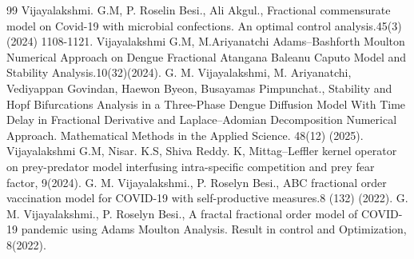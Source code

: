 \documentclass[10pt]{article}
\begin{document}
\begin{thebibliography}{99}
		 Vijayalakshmi. G.M, P. Roselin Besi., Ali Akgul., Fractional commensurate model on Covid-19 with microbial confections. An optimal control analysis.45(3) (2024) 1108-1121.
		 Vijayalakshmi G.M, M.Ariyanatchi Adams–Bashforth Moulton Numerical Approach on Dengue Fractional Atangana Baleanu Caputo Model and Stability Analysis.10(32)(2024).
		 G. M. Vijayalakshmi, M. Ariyanatchi, Vediyappan Govindan, Haewon Byeon, Busayamas Pimpunchat., Stability and Hopf Bifurcations Analysis in a Three-Phase Dengue Diffusion Model With Time Delay in Fractional Derivative and Laplace–Adomian Decomposition Numerical Approach. Mathematical Methods in the Applied Science. 48(12) (2025).
		 Vijayalakshmi G.M, Nisar. K.S, Shiva Reddy. K, Mittag–Leffler kernel operator on prey-predator model interfusing intra-specific competition and prey fear factor, 9(2024).
		 G. M. Vijayalakshmi., P. Roselyn Besi., ABC fractional order vaccination model for COVID-19 with self-productive measures.8 (132) (2022).
		 G. M. Vijayalakshmi., P. Roselyn Besi., A fractal fractional order model of COVID-19 pandemic using Adams Moulton Analysis. Result in control and Optimization, 8(2022).
	\end{thebibliography}
	
	
\end{document}
